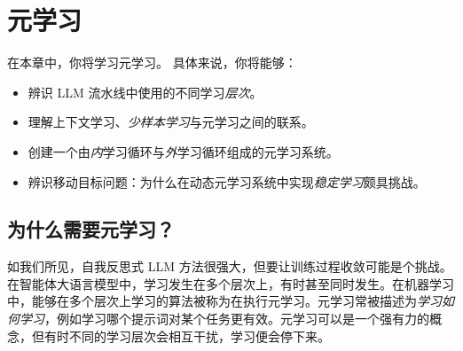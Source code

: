 

\chapter{元学习}\label{chap:meta}

\begin{learningbox}
在本章中，你将学习元学习。
具体来说，你将能够：
\begin{itemize}[leftmargin=*, nosep]
    \item 辨识 LLM 流水线中使用的不同学习{\em 层次}。

 \item 理解上下文学习、{\em 少样本学习}与元学习之间的联系。

    \item 创建一个由{\em 内}学习循环与{\em 外}学习循环组成的元学习系统。
      
    \item 辨识移动目标问题：为什么在动态元学习系统中实现{\em 稳定学习}颇具挑战。

\end{itemize}
\end{learningbox}





\section{为什么需要元学习？}
如我们所见，自我反思式 LLM 方法很强大，但要让训练过程收敛可能是个挑战。在智能体大语言模型中，学习发生在多个层次上，有时甚至同时发生。在机器学习中，能够在多个层次上学习的算法被称为在执行元学习。元学习常被描述为{\em 学习如何学习}，例如学习哪个提示词对某个任务更有效。元学习可以是一个强有力的概念，但有时不同的学习层次会相互干扰，学习便会停下来。

